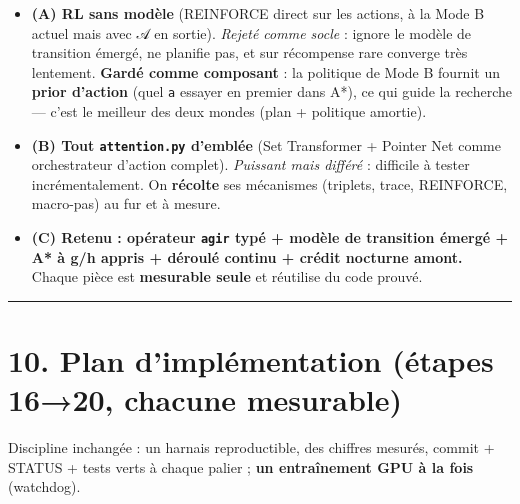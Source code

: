 \documentclass[
  french,
  11pt,
]{article}
\providecommand{\tightlist}{%
  \setlength{\itemsep}{0pt}\setlength{\parskip}{0pt}}
\begin{document}
\begin{itemize}
\tightlist
\item
  \textbf{(A) RL sans modèle} (REINFORCE direct sur les actions, à la
  Mode B actuel mais avec 𝒜 en sortie). \emph{Rejeté comme socle} :
  ignore le modèle de transition émergé, ne planifie pas, et sur
  récompense rare converge très lentement. \textbf{Gardé comme
  composant} : la politique de Mode B fournit un \textbf{prior d'action}
  (quel \texttt{a} essayer en premier dans A*), ce qui guide la
  recherche --- c'est le meilleur des deux mondes (plan + politique
  amortie).
\item
  \textbf{(B) Tout \texttt{attention.py} d'emblée} (Set Transformer +
  Pointer Net comme orchestrateur d'action complet). \emph{Puissant mais
  différé} : difficile à tester incrémentalement. On \textbf{récolte}
  ses mécanismes (triplets, trace, REINFORCE, macro-pas) au fur et à
  mesure.
\item
  \textbf{(C) Retenu : opérateur \texttt{agir} typé + modèle de
  transition émergé + A* à g/h appris + déroulé continu + crédit
  nocturne amont.} Chaque pièce est \textbf{mesurable seule} et
  réutilise du code prouvé.
\end{itemize}

\begin{center}\rule{0.5\linewidth}{0.5pt}\end{center}

\section{10. Plan d'implémentation (étapes 16→20, chacune
mesurable)}\label{plan-dimpluxe9mentation-uxe9tapes-1620-chacune-mesurable}

Discipline inchangée : un harnais reproductible, des chiffres mesurés,
commit + STATUS + tests verts à chaque palier ; \textbf{un entraînement
GPU à la fois} (watchdog).
\end{document}
